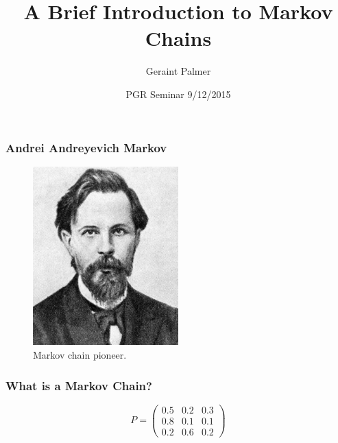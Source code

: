 \documentclass{beamer}
\title
{A Brief Introduction to Markov Chains}
\author{Geraint Palmer}
\date{PGR Seminar 9/12/2015}
\begin{document}
\frame{\titlepage}


\begin{frame}
\frametitle{Andrei Andreyevich Markov}
\begin{figure}
  \includegraphics[width=0.5\textwidth]{andreimarkovmathematician}
  \caption{Markov chain pioneer.}
\end{figure}
\end{frame}



\begin{frame}
\frametitle{What is a Markov Chain?}
\begin{figure}
  
\end{figure}
\end{frame}



\begin{frame}
\huge{
\begin{equation*}
 P =  \left( \begin{array}{ccc}
0.5 & 0.2 & 0.3 \\
0.8 & 0.1 & 0.1 \\
0.2 & 0.6 & 0.2 \end{array} \right)
\end{equation*}
}
\end{frame}



\begin{frame}
\begin{figure}
\end{figure}
\end{frame}
\end{document}
